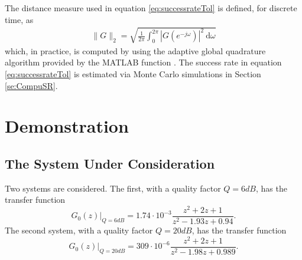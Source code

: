 

The distance measure used in equation \eqref{eq:successrateTol} is defined, for discrete time, as
\begin{align}
\|G\|_2 = \sqrt{\frac{1}{2\pi}\int_0^{2\pi} |G(e^{-j\omega})|^2\ \mathrm{d}\omega}
\end{align}
 which, in practice, is computed by using the adaptive global quadrature algorithm provided by the MATLAB function .
The success rate in equation \eqref{eq:successrateTol} is estimated via Monte Carlo simulations in  Section \ref{se:CompuSR}.



\section{Demonstration}\label{se:Demo}

\subsection{The System Under Consideration}

Two systems are considered. The first, with a quality factor $Q = 6\unit{dB}$, has the transfer function
  \begin{equation}
     G_0(z) \Big|_{Q=6\unit{dB}}
    = 1.74 \cdot 10^{-3}
    \frac{ z^2 + 2 z + 1 }
         { z^2 - 1.93 z + 0.94}
    \label{eq:systemundertest}
    \text{.}
  \end{equation}
The second system, with a quality factor $Q = 20\unit{dB}$, has the transfer function
  \begin{equation}
    G_0(z) \Big|_{Q=20\unit{dB}}
    = 309 \cdot 10^{-6}
            \frac{z^2 + 2 z + 1}
                 {z^2 - 1.98 z + 0.989}
    \label{eq:systundertest-20dB}
    \text{.}
  \end{equation}

